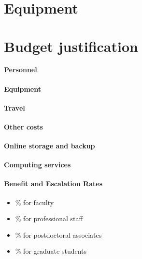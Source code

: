\documentclass[12pt]{article}
\begin{document}
\clearpage
\section*{Equipment}


\clearpage
\section*{Budget justification}

\paragraph{Personnel}

\paragraph{Equipment}

\paragraph{Travel}

\paragraph{Other costs}

\paragraph{Online storage and backup}

\paragraph{Computing services}
 
\paragraph{Benefit and Escalation Rates}
\begin{itemize}
\item \% for faculty
\item \% for professional staff
\item \% for postdoctoral associates
\item \% for graduate students
\end{itemize}
\end{document}

